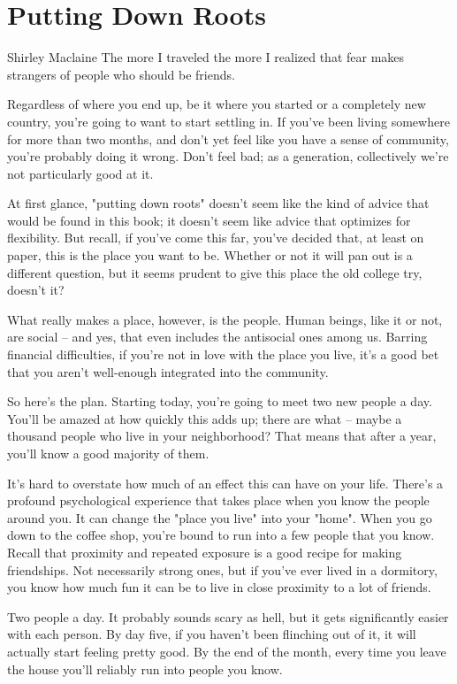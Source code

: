 \documentclass[../the-millions-of-gestures.tex]{subfiles}
\begin{document}
\chapter{Putting Down Roots}

\begin{aquote}{Shirley Maclaine}
  The more I traveled the more I realized that fear makes strangers of people
  who should be friends.
\end{aquote}

Regardless of where you end up, be it where you started or a completely new
country, you're going to want to start settling in. If you've been living
somewhere for more than two months, and don't yet feel like you have a sense of
community, you're probably doing it wrong. Don't feel bad; as a generation,
collectively we're not particularly good at it.

At first glance, "putting down roots" doesn't seem like the kind of advice that
would be found in this book; it doesn't seem like advice that optimizes for
flexibility. But recall, if you've come this far, you've decided that, at least
on paper, this is the place you want to be. Whether or not it will pan out is a
different question, but it seems prudent to give this place the old college try,
doesn't it?

What really makes a place, however, is the people. Human beings, like it or not,
are social -- and yes, that even includes the antisocial ones among us. Barring
financial difficulties, if you're not in love with the place you live, it's a
good bet that you aren't well-enough integrated into the community.

So here's the plan. Starting today, you're going to meet two new people a day.
You'll be amazed at how quickly this adds up; there are what -- maybe a thousand
people who live in your neighborhood? That means that after a year, you'll know
a good majority of them.

It's hard to overstate how much of an effect this can have on your life. There's
a profound psychological experience that takes place when you know the people
around you. It can change the "place you live" into your "home". When you go
down to the coffee shop, you're bound to run into a few people that you know.
Recall that proximity and repeated exposure is a good recipe for making
friendships. Not necessarily strong ones, but if you've ever lived in a
dormitory, you know how much fun it can be to live in close proximity to a lot
of friends.

Two people a day. It probably sounds scary as hell, but it gets significantly
easier with each person. By day five, if you haven't been flinching out of it,
it will actually start feeling pretty good. By the end of the month, every time
you leave the house you'll reliably run into people you know.
\end{document}
